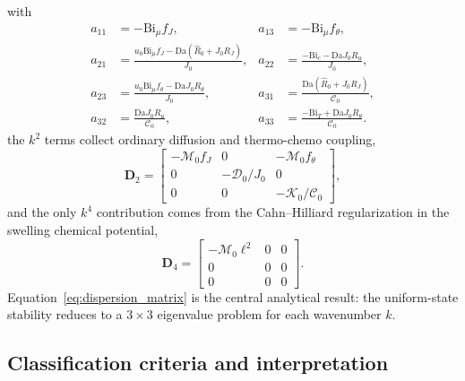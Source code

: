 \documentclass[aps,pre,reprint,superscriptaddress,longbibliography,floatfix]{revtex4-2}
\newcommand{\Ms}{\mathcal{M}}
\newcommand{\Ds}{\mathcal{D}}
\newcommand{\Cs}{\mathcal{C}}
\newcommand{\Ks}{\mathcal{K}}
\newcommand{\Da}{\mathrm{Da}}
\newcommand{\Bi}{\mathrm{Bi}}
\newcommand{\Rhat}{\widehat{R}}
\begin{document}
with
\begin{subequations}
\label{eq:A0_entries}
\begin{align}
  a_{11} &= -\Bi_\mu f_J, &
  a_{13} &= -\Bi_\mu f_\theta, \\
  a_{21} &= \frac{u_0\Bi_\mu f_J - \Da(\Rhat_0 + J_0R_J)}{J_0}, &
  a_{22} &= \frac{-\Bi_c - \Da J_0 R_u}{J_0}, \\
  a_{23} &= \frac{u_0\Bi_\mu f_\theta - \Da J_0 R_\theta}{J_0}, &
  a_{31} &= \frac{\Da(\Rhat_0 + J_0R_J)}{\Cs_0}, \\
  a_{32} &= \frac{\Da J_0 R_u}{\Cs_0}, &
  a_{33} &= \frac{-\Bi_T + \Da J_0R_\theta}{\Cs_0}.
\end{align}
\end{subequations}
the $k^2$ terms collect ordinary diffusion and thermo-chemo coupling,
\begin{equation}
  \mathbf D_2 =
  \begin{bmatrix}
    -\Ms_0 f_J & 0 & -\Ms_0 f_\theta \\
    0 & -\Ds_0/J_0 & 0 \\
    0 & 0 & -\Ks_0/\Cs_0
  \end{bmatrix},
  \label{eq:D2}
\end{equation}
and the only $k^4$ contribution comes from the Cahn--Hilliard
regularization in the swelling chemical potential,
\begin{equation}
  \mathbf D_4 =
  \begin{bmatrix}
    -\Ms_0\ell^2 & 0 & 0 \\
    0 & 0 & 0 \\
    0 & 0 & 0
  \end{bmatrix}.
  \label{eq:D4}
\end{equation}
Equation~\eqref{eq:dispersion_matrix} is the central analytical result:
the uniform-state stability reduces to a $3\times 3$ eigenvalue problem
for each wavenumber $k$.

\subsection{Classification criteria and interpretation}
\end{document}
